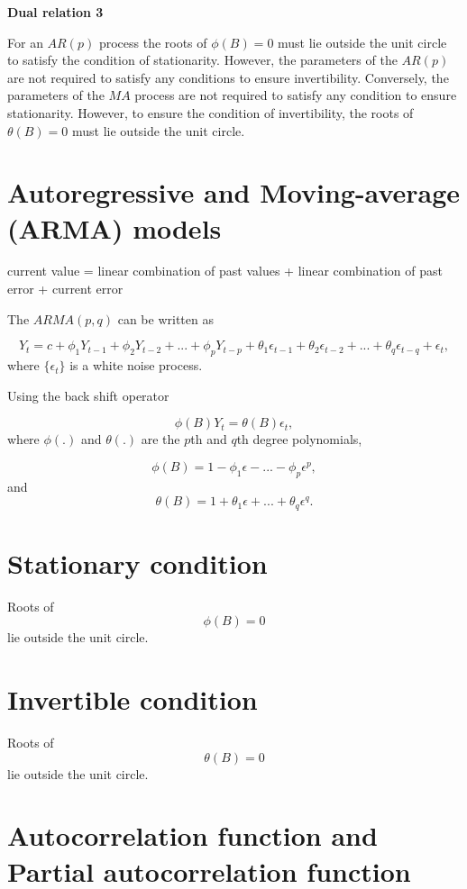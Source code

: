 \documentclass[
  11pt,
  a4paper,
]{report}
\begin{document}
\textbf{Dual relation 3}

For an \(AR(p)\) process the roots of \(\phi(B)=0\) must lie outside the
unit circle to satisfy the condition of stationarity. However, the
parameters of the \(AR(p)\) are not required to satisfy any conditions
to ensure invertibility. Conversely, the parameters of the \(MA\)
process are not required to satisfy any condition to ensure
stationarity. However, to ensure the condition of invertibility, the
roots of \(\theta(B)=0\) must lie outside the unit circle.

\section{Autoregressive and Moving-average (ARMA)
models}\label{autoregressive-and-moving-average-arma-models}

current value = linear combination of past values + linear combination
of past error + current error

The \(ARMA(p, q)\) can be written as

\[Y_t=c+\phi_1 Y_{t-1}+\phi_2 Y_{t-2}+...+\phi_p Y_{t-p}+\theta_1\epsilon_{t-1}+\theta_2\epsilon_{t-2}+...+\theta_q\epsilon_{t-q}+\epsilon_t,\]
where \(\{\epsilon_t\}\) is a white noise process.

Using the back shift operator

\[\phi(B)Y_t=\theta(B)\epsilon_t,\] where \(\phi(.)\) and \(\theta(.)\)
are the \(p\)th and \(q\)th degree polynomials,

\[\phi(B)=1-\phi_1 \epsilon -...-\phi_p \epsilon^p,\] and
\[\theta(B)=1+\theta_1\epsilon+...+\theta_q\epsilon^q.\]

\section{Stationary condition}\label{stationary-condition}

Roots of \[\phi(B)=0\] lie outside the unit circle.

\section{Invertible condition}\label{invertible-condition}

Roots of \[\theta(B)=0\] lie outside the unit circle.

\section{Autocorrelation function and Partial autocorrelation
function}\label{autocorrelation-function-and-partial-autocorrelation-function}
\end{document}
